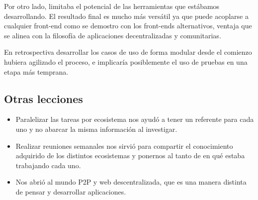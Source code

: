 Por otro lado, limitaba el potencial de las herramientas que estábamos desarrollando. El resultado final es mucho más versátil ya que puede acoplarse a cualquier front-end como se demostro con los front-ends alternativos, ventaja que se alinea con la filosofía de aplicaciones decentralizadas y comunitarias.

En retrospectiva desarrollar los casos de uso de forma modular desde el comienzo hubiera agilizado el proceso, e implicaría posiblemente el uso de pruebas en una etapa más temprana.

\subsection{Otras lecciones}

\begin{itemize}
    \item Paralelizar las tareas por ecosistema nos ayudó a tener un referente para cada uno y no abarcar la misma información al investigar.

    \item Realizar reuniones semanales nos sirvió para compartir el conocimiento adquirido de los distintos ecosistemas y ponernos al tanto de en qué estaba trabajando cada uno.

    \item Nos abrió al mundo P2P y web descentralizada, que es una manera distinta de pensar y desarrollar aplicaciones.

\end{itemize}